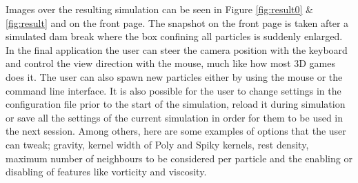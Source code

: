 Images over the resulting simulation can be seen in Figure \ref{fig:result0}  \& \ref{fig:result} and
on the front page. The snapshot on the front page is taken after a simulated
dam break where the box confining all particles is suddenly enlarged.  In the
final application the user can steer the camera position with the keyboard and
control the view direction with the mouse, much like how most 3D games does it.
The user can also spawn new particles either by using the mouse or the command
line interface. It is also possible for the user to change settings in the
configuration file prior to the start of the simulation, reload it during
simulation or save all the settings of the current simulation in order for them
to be used in the next session. Among others, here are some examples of options
that the user can tweak; gravity, kernel width of Poly and Spiky kernels, rest
density, maximum number of neighbours to be considered per particle and the
enabling or disabling of features like vorticity and viscosity.


